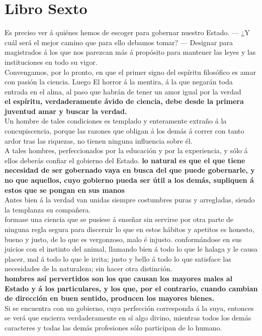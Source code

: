 \documentclass[10pt]{book}
\begin{document}
\chapter*{Libro Sexto}
Es preciso ver á quiénes hemos de escoger para gobernar nuestro Estado. — ¿Y cuál será el mejor camino que para ello debamos tomar? — Designar para magistrados á los que nos parezcan más á propósito para mantener las leyes y las instituciones en todo su vigor. \\
Convengamos, por lo pronto, en que el primer signo del espíritu filosófico es amar con pasión la ciencia. Luego El horror á la mentira, á la que negarán toda entrada en el alma, al paso que habrán de tener un amor igual por la verdad\\
\textbf{el espíritu, verdaderamente ávido de ciencia, debe desde la primera juventud amar y buscar la verdad.}\\
Un hombre de tales condiciones es templado y enteramente extraño á la concupiscencia, porque las razones que obligan á los demás á correr con tanto ardor tras las riquezas, no tienen ninguna influencia sobre él.\\  
A tales hombres, perfeccionados por la educación y por la experiencia, y sólo á ellos deberás confiar el gobierno del Estado. 
\textbf{lo natural es que el que tiene necesidad de ser gobernado vaya en busca del que puede gobernarle, y no que aquellos, cuyo gobierno pueda ser útil a los demás, supliquen á estos que se pongan en sus manos}\\
Antes bien á la verdad van unidas siempre costumbres puras y arregladas, siendo la templanza su compañera. \\
formase una ciencia que se pusiese á enseñar sin servirse por otra parte de ninguna regla segura para discernir lo que en estos hábitos y apetitos es honesto, bueno y justo, de lo que es vergonzoso, malo é injusto. conformándose en sus juicios con el instinto del animal, llamando bien á todo lo que le halaga y le causa placer, mal á todo lo que le irrita; justo y bello á todo lo que satisface las necesidades de la naturaleza; sin hacer otra distinción.\\
\textbf{hombres así pervertidos son los que causan los mayores males al Estado y á los particulares, y los que, por el contrario, cuando cambian de dirección en buen sentido, producen los mayores bienes.}\\
 Si se encuentra con un gobierno, cuya perfección corresponda á la suya, entonces se verá que encierra verdaderamente en sí algo divino, mientras todos los demás caracteres y todas las demás profesiones sólo participan de lo humano. \\
\end{document}
